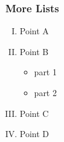 \documentclass{beamer}
\begin{document}

\begin{frame}
\frametitle{More Lists}
\begin{enumerate}[(I)]
\item<1-> Point A
\item<2-> Point B
\begin{itemize}
\item<3-> part 1
\item<4-> part 2
\end{itemize}
\item<5-> Point C
\item<6-> Point D
\end{enumerate}
\end{frame}
\end{document}
